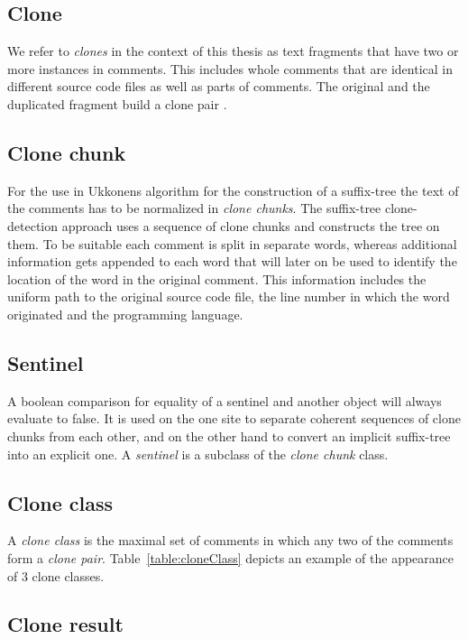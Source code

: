\subsection{Clone}
We refer to \textit{clones} in the context of this thesis as text fragments that have two or more instances in comments. This includes whole comments that are identical in different source code files as well as parts of comments. The original and the duplicated fragment build a clone pair \cite{Roy2007}. 

\subsection{Clone chunk}
For the use in Ukkonens algorithm for the construction of a suffix-tree \cite{Ukkonen1995} the text of the comments has to be normalized in \textit{clone chunks}. The suffix-tree clone-detection approach uses a sequence of clone chunks and constructs the tree on them. To be suitable each comment is split in separate words, whereas additional information gets appended to each word that will later on be used to identify the location of the word in the original comment. This information includes the uniform path to the original source code file, the line number in which the word originated and the programming language.

\subsection{Sentinel}
\label{section:sentinel}
A boolean comparison for equality of a sentinel and another object will always evaluate to false. It is used on the one site to separate coherent sequences of clone chunks from each other, and on the other hand to convert an implicit suffix-tree into an explicit one. A \textit{sentinel} is a subclass of the \textit{clone chunk} class. 

\subsection{Clone class}
A \textit{clone class} is the maximal set of comments in which any two of the comments form a \textit{clone pair}.
Table~\ref{table:cloneClass} depicts an example of the appearance of 3
clone classes.


\subsection{Clone result}




